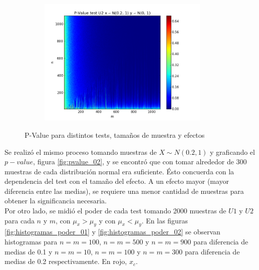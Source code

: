 \documentclass[%
 reprint,
 amsmath,amssymb,
 aps,
spanish]{revtex4-1}
\begin{document}
\begin{figure}[t]
\begin{subfigure}[t]{0.45\textwidth}
    \end{subfigure}
    \begin{subfigure}[t]{0.45\textwidth}
      \centering
      \includegraphics[width=0.9\textwidth]{imagenes/U2_02}
    \end{subfigure} 
    \label{fig:pvalue}
    \caption{P-Value para distintos tests, tamaños de muestra y efectos}
\end{figure}
Se realizó el mismo proceso tomando muestras de $X \sim N(0.2, 1)$ y graficando el $p-value$, figura \ref{fig:pvalue_02}, y se encontró que con tomar alrededor de 300 muestras de cada distribución 
normal era suficiente. Ésto concuerda con la dependencia del test con el tamaño del efecto. A un efecto mayor (mayor diferencia entre las medias), se requiere una menor cantidad de muestras para 
obtener la significancia necesaria.\\
Por otro lado, se midió el poder de cada test tomando 2000 muestras de $U1$ y $U2$ para cada $n$ y $m$, con $\mu_x > \mu_y$ y con $\mu_x < \mu_y$. En las figuras \ref{fig:histogramas_poder_01} y  
\ref{fig:histogramas_poder_02} se observan histogramas para $n=m=100$, $n=m=500$ y $n=m=900$ para diferencia de medias de 0.1 y $n=m=10$, $n=m=100$ y $n=m=300$ para diferencia de medias de 0.2 
respectivamente. En rojo, $x_c$.
\end{document}
